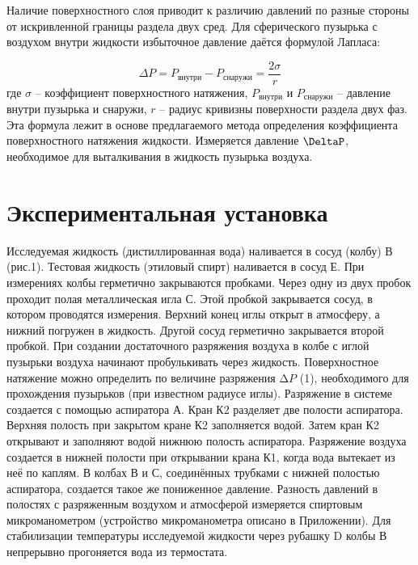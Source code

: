 \documentclass[12pt,a4paper]{article}
\begin{document}
Наличие поверхностного слоя приводит к различию давлений по разные стороны от искривленной границы раздела двух сред.  Для сферического пузырька с воздухом  внутри жидкости избыточное давление даётся формулой Лапласа:

\begin{equation}
    \Delta P = P_{внутри} - P_{снаружи} = \frac{2\sigma}{r}
\end{equation}
где $\sigma$ – коэффициент поверхностного натяжения, $P_{внутри}$ и $P_{снаружи}$ – давление внутри пузырька и снаружи, $r$ – радиус кривизны поверхности раздела двух фаз. Эта формула лежит в основе предлагаемого метода определения коэффициента поверхностного натяжения жидкости. Измеряется давление $\DeltaP$, необходимое для выталкивания в жидкость пузырька воздуха.


\section{Экспериментальная установка}

Исследуемая жидкость (дистиллированная вода) наливается в сосуд (колбу) В (рис.1). Тестовая жидкость  (этиловый спирт) наливается  в сосуд Е.  При измерениях  колбы герметично закрываются  пробками.   Через одну из двух пробок  проходит полая металлическая игла С. Этой пробкой закрывается сосуд, в котором  проводятся измерения. Верхний конец иглы открыт в атмосферу, а нижний погружен в жидкость. Другой сосуд герметично закрывается второй пробкой. При создании достаточного  разряжения воздуха в колбе с иглой пузырьки воздуха начинают пробулькивать через жидкость. Поверхностное натяжение можно определить по величине разряжения $∆P$ (1), необходимого для прохождения пузырьков (при известном радиусе иглы).
Разряжение в системе создается с помощью аспиратора А. Кран К2 разделяет две полости аспиратора. Верхняя полость при закрытом кране К2  заполняется водой. Затем кран К2 открывают и заполняют водой  нижнюю полость  аспиратора.  Разряжение воздуха создается в нижней полости  при открывании крана К1, когда  вода вытекает из неё по каплям. В колбах В и С, соединённых трубками с нижней полостью аспиратора,  создается такое же пониженное давление. Разность давлений в полостях с разряженным воздухом и атмосферой измеряется спиртовым микроманометром (устройство микроманометра описано в Приложении). 
Для стабилизации температуры исследуемой жидкости через рубашку D колбы В непрерывно прогоняется вода из термостата.
\end{document}
